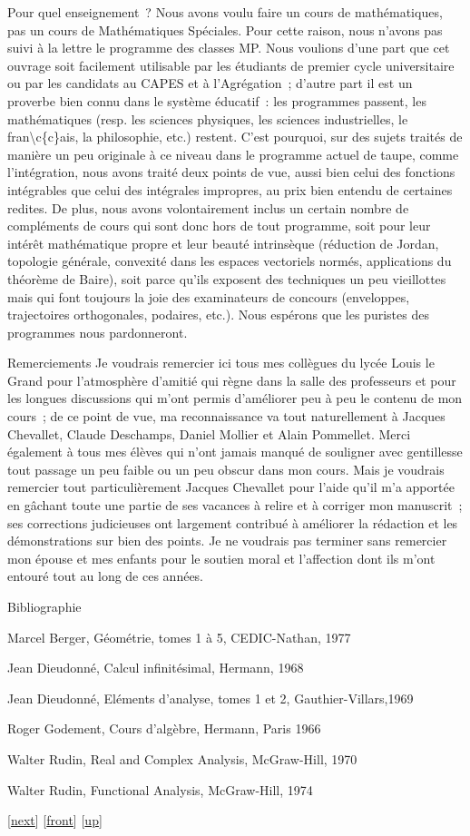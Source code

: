\documentclass[]{article}
\begin{document}
Pour quel enseignement~? Nous avons voulu faire un cours de
mathématiques, pas un cours de Mathématiques Spéciales. Pour cette
raison, nous n'avons pas suivi à la lettre le programme des classes MP.
Nous voulions d'une part que cet ouvrage soit facilement utilisable par
les étudiants de premier cycle universitaire ou par les candidats au
CAPES et à l'Agrégation~; d'autre part il est un proverbe bien connu
dans le système éducatif~: les programmes passent, les mathématiques
(resp. les sciences physiques, les sciences industrielles, le
fran\textbackslash{}c\{c\}ais, la philosophie, etc.) restent. C'est
pourquoi, sur des sujets traités de manière un peu originale à ce niveau
dans le programme actuel de taupe, comme l'intégration, nous avons
traité deux points de vue, aussi bien celui des fonctions intégrables
que celui des intégrales impropres, au prix bien entendu de certaines
redites. De plus, nous avons volontairement inclus un certain nombre de
compléments de cours qui sont donc hors de tout programme, soit pour
leur intérêt mathématique propre et leur beauté intrinsèque (réduction
de Jordan, topologie générale, convexité dans les espaces vectoriels
normés, applications du théorème de Baire), soit parce qu'ils exposent
des techniques un peu vieillottes mais qui font toujours la joie des
examinateurs de concours (enveloppes, trajectoires orthogonales,
podaires, etc.). Nous espérons que les puristes des programmes nous
pardonneront.

Remerciements Je voudrais remercier ici tous mes collègues du lycée
Louis le Grand pour l'atmosphère d'amitié qui règne dans la salle des
professeurs et pour les longues discussions qui m'ont permis d'améliorer
peu à peu le contenu de mon cours~; de ce point de vue, ma
reconnaissance va tout naturellement à Jacques Chevallet, Claude
Deschamps, Daniel Mollier et Alain Pommellet. Merci également à tous mes
élèves qui n'ont jamais manqué de souligner avec gentillesse tout
passage un peu faible ou un peu obscur dans mon cours. Mais je voudrais
remercier tout particulièrement Jacques Chevallet pour l'aide qu'il m'a
apportée en gâchant toute une partie de ses vacances à relire et à
corriger mon manuscrit~; ses corrections judicieuses ont largement
contribué à améliorer la rédaction et les démonstrations sur bien des
points. Je ne voudrais pas terminer sans remercier mon épouse et mes
enfants pour le soutien moral et l'affection dont ils m'ont entouré tout
au long de ces années.

Bibliographie

Marcel Berger, Géométrie, tomes 1 à 5, CEDIC-Nathan, 1977

Jean Dieudonné, Calcul infinitésimal, Hermann, 1968

Jean Dieudonné, Eléments d'analyse, tomes 1 et 2, Gauthier-Villars,1969

Roger Godement, Cours d'algèbre, Hermann, Paris 1966

Walter Rudin, Real and Complex Analysis, McGraw-Hill, 1970

Walter Rudin, Functional Analysis, McGraw-Hill, 1974

{[}\href{coursli1.html}{next}{]} {[}\href{coursch1.html}{front}{]}
{[}\href{cours.html\#coursch1.html}{up}{]}
\end{document}
